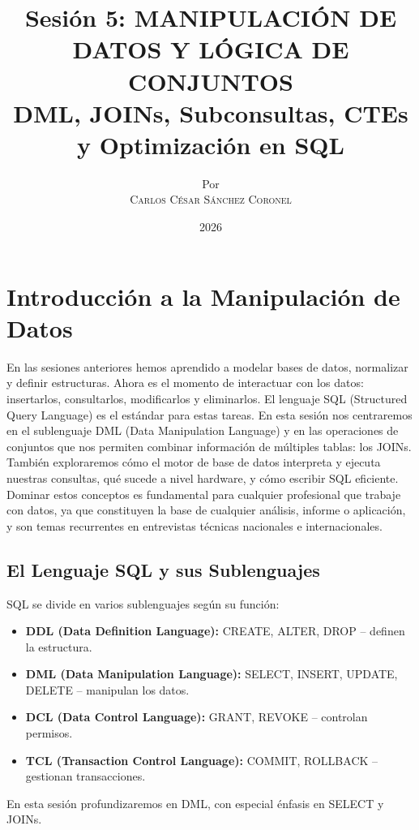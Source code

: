 \documentclass[12pt,a4paper,openany,oneside]{book}
\title{
    \Huge \textbf{Sesión 5: MANIPULACIÓN DE DATOS Y LÓGICA DE CONJUNTOS} \\
    \large DML, JOINs, Subconsultas, CTEs y Optimización en SQL
}
\author{
    \small Por \\ \vspace{0.2cm}
    \Large \textsc{Carlos César Sánchez Coronel}
}
\date{2026}
\begin{document}
\maketitle

\tableofcontents
{}

\chapter{Introducción a la Manipulación de Datos}
En las sesiones anteriores hemos aprendido a modelar bases de datos, normalizar y definir estructuras. Ahora es el momento de interactuar con los datos: insertarlos, consultarlos, modificarlos y eliminarlos. El lenguaje SQL (Structured Query Language) es el estándar para estas tareas. En esta sesión nos centraremos en el sublenguaje DML (Data Manipulation Language) y en las operaciones de conjuntos que nos permiten combinar información de múltiples tablas: los JOINs. También exploraremos cómo el motor de base de datos interpreta y ejecuta nuestras consultas, qué sucede a nivel hardware, y cómo escribir SQL eficiente. Dominar estos conceptos es fundamental para cualquier profesional que trabaje con datos, ya que constituyen la base de cualquier análisis, informe o aplicación, y son temas recurrentes en entrevistas técnicas nacionales e internacionales.

\section{El Lenguaje SQL y sus Sublenguajes}
SQL se divide en varios sublenguajes según su función:
\begin{itemize}
    \item \textbf{DDL (Data Definition Language):} CREATE, ALTER, DROP – definen la estructura.
    \item \textbf{DML (Data Manipulation Language):} SELECT, INSERT, UPDATE, DELETE – manipulan los datos.
    \item \textbf{DCL (Data Control Language):} GRANT, REVOKE – controlan permisos.
    \item \textbf{TCL (Transaction Control Language):} COMMIT, ROLLBACK – gestionan transacciones.
\end{itemize}
En esta sesión profundizaremos en DML, con especial énfasis en SELECT y JOINs.
\end{document}
